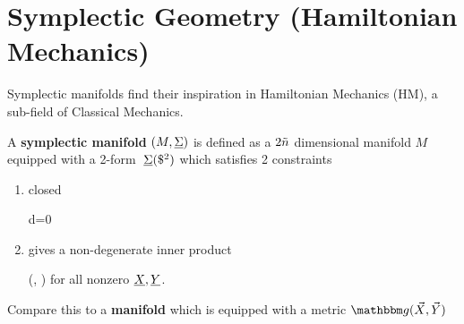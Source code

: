 \section{Symplectic Geometry (Hamiltonian Mechanics)}
\label{sec-symplectic-geo}


Symplectic manifolds
find their inspiration 
in Hamiltonian Mechanics (HM),
a sub-field of Classical Mechanics.

A {\bf symplectic manifold} $(M, \ul{\Sigma})$
is defined as a $2{\tilde{n}}$ dimensional manifold $M$ equipped with a 2-form
$\pform{\Sigma}{2}$
which satisfies 2 constraints

\begin{enumerate}
\item closed

\beq
d\ul{\Sigma}=0
\eeq

\item gives a non-degenerate
inner product

\beq
\ul{\Sigma} (\vecX, \vecY)
\eeq
for all nonzero $\rvX, \rvY$.
\end{enumerate}

Compare this to a {\bf \Rien manifold} which is equipped with a metric $\metric(\vecX, \vecY)$


